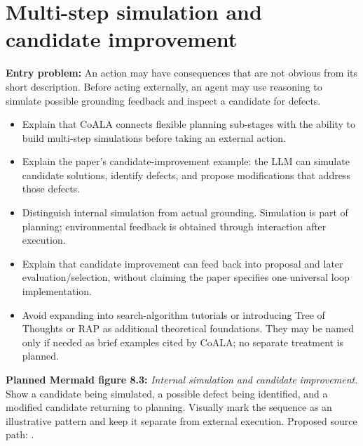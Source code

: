 \section{Multi-step simulation and candidate improvement}
\textbf{Entry problem:} An action may have consequences that are not obvious from its short description. Before acting externally, an agent may use reasoning to simulate possible grounding feedback and inspect a candidate for defects.
\begin{itemize}
  \item Explain that CoALA connects flexible planning sub-stages with the ability to build multi-step simulations before taking an external action.
  \item Explain the paper's candidate-improvement example: the LLM can simulate candidate solutions, identify defects, and propose modifications that address those defects.
  \item Distinguish internal simulation from actual grounding. Simulation is part of planning; environmental feedback is obtained through interaction after execution.
  \item Explain that candidate improvement can feed back into proposal and later evaluation/selection, without claiming the paper specifies one universal loop implementation.
  \item Avoid expanding into search-algorithm tutorials or introducing Tree of Thoughts or RAP as additional theoretical foundations. They may be named only if needed as brief examples cited by CoALA; no separate treatment is planned.
\end{itemize}
\textbf{Planned Mermaid figure 8.3:} \emph{Internal simulation and candidate improvement}. Show a candidate being simulated, a possible defect being identified, and a modified candidate returning to planning. Visually mark the sequence as an illustrative pattern and keep it separate from external execution. Proposed source path: .

